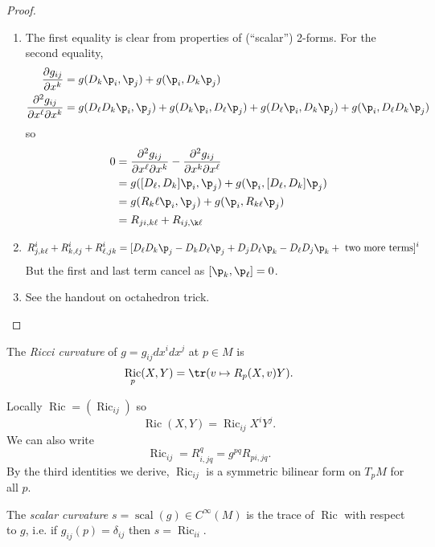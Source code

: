 \documentclass[a4paper]{article}
\DeclareMathOperator{\Ric}{Ric} %
\begin{document}
\begin{proof}\leavevmode
  \begin{enumerate}
  \item The first equality is clear from properties of (``scalar'') 2-forms. For the second equality,
    \begin{align*}
      \frac{\partial g_{ij}}{\partial x^k}
      &= g(D_k\p_i, \p_j) + g(\p_i, D_k \p_j) \\
      \frac{\partial^2 g_{ij}}{\partial x^\ell \partial x^k}
      &= g(D_\ell D_k \p_i, \p_j) + g(D_k \p_i, D_\ell \p_j) + g(D_\ell \p_i, D_k \p_j) + g(\p_i, D_\ell D_k \p_j)
    \end{align*}
    so
    \begin{align*}
      0
      &= \frac{\partial^2 g_{ij}}{\partial x^\ell \partial x^k} - \frac{\partial^2 g_{ij}}{\partial x^k \partial x^\ell} \\
      &= g([D_\ell, D_k] \p_i, \p_j) + g(\p_i, [D_\ell, D_k] \p_j) \\
      &= g(R_k\ell \p_i, \p_j) + g(\p_i, R_{k\ell} \p_j) \\
      &= R_{ji, k\ell} + R_{ij, \k \ell}
    \end{align*}
  \item 
    \begin{align*}
      R^i_{j, k \ell} + R^i_{k, \ell j} + R^i_{\ell, jk}
      &= [D_\ell D_k \p_j - D_k D_\ell \p_j + D_j D_\ell \p_k - D_\ell D_j \p_k + \text{ two more terms}]^i
    \end{align*}
    But the first and last term cancel as \([\p_k, \p_\ell] = 0\).
  \item See the handout on octahedron trick.
  \end{enumerate}
\end{proof}

\begin{definition}
  The \emph{Ricci curvature} of \(g = g_{ij} dx^i dx^j\) at \(p \in M\) is
  \[
    \Ric_p(X, Y) = \tr(v \mapsto R_p(X, v) Y).
  \]
\end{definition}

Locally \(\Ric = (\Ric_{ij})\) so
\[
  \Ric(X, Y) = \Ric_{ij} X^iY^j.
\]
We can also write
\[
  \Ric_{ij} = R^q_{i, jq} = g^{pq} R_{pi, jq}.
\]
By the third identities we derive, \(\Ric_{ij}\) is a symmetric bilinear form on \(T_pM\) for all \(p\).

\begin{definition}
  The \emph{scalar curvature} \(s = \operatorname{scal}(g) \in C^\infty(M)\) is the trace of \(\Ric\) with respect to \(g\), i.e. if \(g_{ij}(p) = \delta_{ij}\) then \(s = \Ric_{ii}\).
\end{definition}
\end{document}

